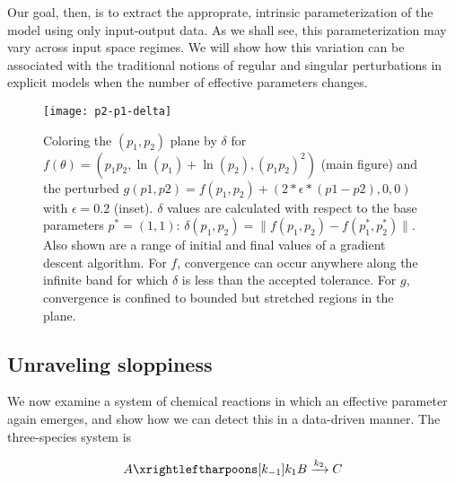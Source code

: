 Our goal, then, is to extract the approprate, intrinsic
parameterization of the model using only input-output data. As we
shall see, this parameterization may vary across input space regimes.
We will show how this variation can be associated with the traditional
notions of regular and singular perturbations in explicit models when
the number of effective parameters changes.


\begin{figure}
  \centerline{\texttt{[image: p2-p1-delta]}}
  \caption[Illustration of effects of sloppiness on
  optimization]{Coloring the $(p_1, p_2)$ plane by $\delta$ for
    $f(\theta) = (p_1 p_2 , \ln(p_1) + \ln(p_2) , (p_1 p_2)^2)$ (main
    figure) and the perturbed $g(p1, p2) = f(p_1, p_2) +
    \left(2*\epsilon*(p1 - p2), 0, 0\right)$ with $\epsilon = 0.2$
    (inset). $\delta$ values are calculated with respect to the base
    parameters $p^* = (1, 1)$: $\delta(p_1, p_2) = \| f(p_1, p_2) -
    f(p_1^*, p_2^*)\|$. Also shown are a range of initial and final values of
    a gradient descent algorithm. For $f$, convergence can occur
    anywhere along the infinite band for which $\delta$ is less than
    the accepted tolerance. For $g$, convergence is confined to
    bounded but stretched regions in the plane.
    \label{fig:non-id} }
\end{figure}



\subsection{Unraveling sloppiness} \label{sec:rr}

We now examine a system of chemical reactions in which an effective
parameter again emerges, and show how we can detect this in a
data-driven manner. The three-species system is

\begin{align}
  A
  \xrightleftharpoons[k_{-1}]{k_1}
  B
  \xrightarrow[]{k_2}
  C
  \label{mech:abc}
\end{align}


